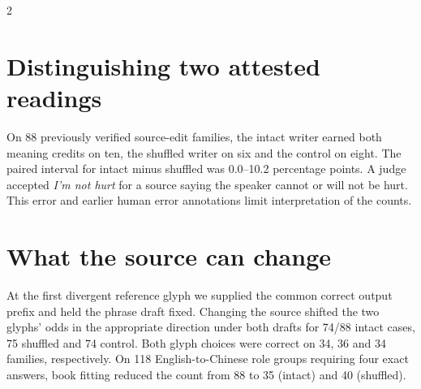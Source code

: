 \documentclass[10pt,a4paper]{article}
\begin{document}
\begin{multicols}{2}
\section*{Distinguishing two attested readings}
On 88 previously verified source-edit families, the intact writer earned both meaning credits on ten, the shuffled writer on six and the control on eight. The paired interval for intact minus shuffled was 0.0--10.2 percentage points. A judge accepted \emph{I'm not hurt} for a source saying the speaker cannot or will not be hurt. This error and earlier human error annotations limit interpretation of the counts.\cite{freitagmqm}
\columnbreak
\section*{What the source can change}
At the first divergent reference glyph we supplied the common correct output prefix and held the phrase draft fixed. Changing the source shifted the two glyphs' odds in the appropriate direction under both drafts for 74/88 intact cases, 75 shuffled and 74 control. Both glyph choices were correct on 34, 36 and 34 families, respectively. On 118 English-to-Chinese role groups requiring four exact answers, book fitting reduced the count from 88 to 35 (intact) and 40 (shuffled).
\end{multicols}
\end{document}
